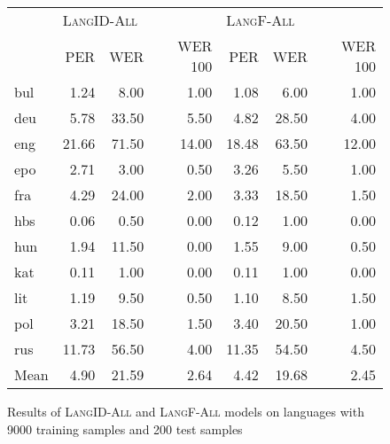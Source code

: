 \begin{figure}
\centering
\begin{tabular}{lrrrrrr}
\toprule
{} & \multicolumn{3}{l}{\textsc{LangID-All}} & \multicolumn{3}{l}{\textsc{LangF-All}} \\
{} &        PER & WER & WER 100 &       PER & WER & WER 100 \\
\midrule
bul  &       1.24 &  8.00 &    1.00 &      1.08 &  6.00 &    1.00 \\
deu  &       5.78 & 33.50 &    5.50 &      4.82 & 28.50 &    4.00 \\
eng  &      21.66 & 71.50 &   14.00 &     18.48 & 63.50 &   12.00 \\
epo  &       2.71 &  3.00 &    0.50 &      3.26 &  5.50 &    1.00 \\
fra  &       4.29 & 24.00 &    2.00 &      3.33 & 18.50 &    1.50 \\
hbs  &       0.06 &  0.50 &    0.00 &      0.12 &  1.00 &    0.00 \\
hun  &       1.94 & 11.50 &    0.00 &      1.55 &  9.00 &    0.50 \\
kat  &       0.11 &  1.00 &    0.00 &      0.11 &  1.00 &    0.00 \\
lit  &       1.19 &  9.50 &    0.50 &      1.10 &  8.50 &    1.50 \\
pol  &       3.21 & 18.50 &    1.50 &      3.40 & 20.50 &    1.00 \\
rus  &      11.73 & 56.50 &    4.00 &     11.35 & 54.50 &    4.50 \\
\midrule
Mean &       4.90 & 21.59 &    2.64 &      4.42 & 19.68 &    2.45 \\
\bottomrule
\end{tabular}
\caption{Results of \textsc{LangID-All} and \textsc{LangF-All} models on languages with 9000 training samples and 200 test samples}
\label{figure:big-lang-results}
\end{figure}


